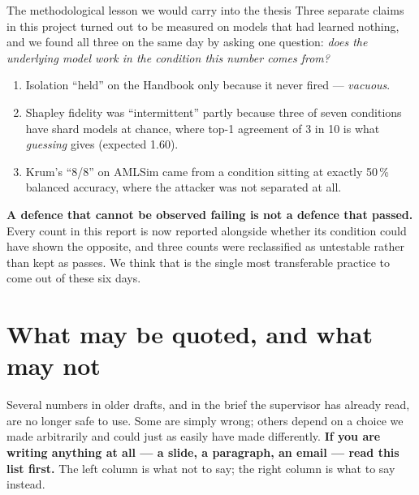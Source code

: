 \documentclass[11pt]{article}
\begin{document}
\begin{warnbox}{The methodological lesson we would carry into the thesis}
Three separate claims in this project turned out to be measured on models that had learned nothing, and we
found all three on the same day by asking one question: \emph{does the underlying model work in the
condition this number comes from?}

\begin{enumerate}\itemsep2pt
  \item Isolation ``held'' on the Handbook only because it never fired --- \emph{vacuous}.
  \item Shapley fidelity was ``intermittent'' partly because three of seven conditions have shard models
        at chance, where top-1 agreement of 3 in 10 is what \emph{guessing} gives (expected 1.60).
  \item Krum's ``8/8'' on AMLSim came from a condition sitting at exactly 50\,\% balanced accuracy, where
        the attacker was not separated at all.
\end{enumerate}

\textbf{A defence that cannot be observed failing is not a defence that passed.} Every count in this
report is now reported alongside whether its condition could have shown the opposite, and three counts
were reclassified as untestable rather than kept as passes. We think that is the single most transferable
practice to come out of these six days.
\end{warnbox}

\section{What may be quoted, and what may not}
\label{sec:quotable}

Several numbers in older drafts, and in the brief the supervisor has already read, are no longer safe to
use. Some are simply wrong; others depend on a choice we made arbitrarily and could just as easily have
made differently. \textbf{If you are writing anything at all --- a slide, a paragraph, an email --- read
this list first.} The left column is what not to say; the right column is what to say instead.
\end{document}
